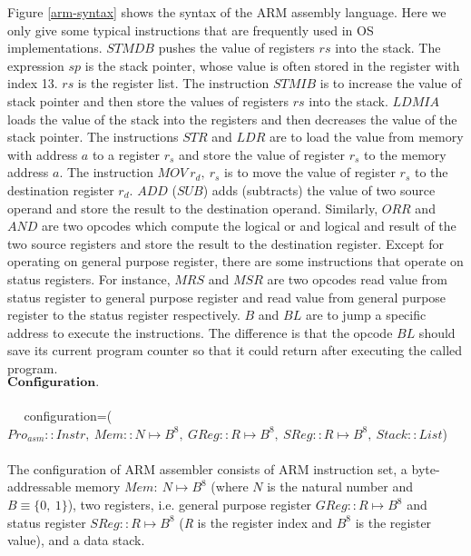 \documentclass[conference]{IEEEtran}
\begin{document}
\par Figure \ref{arm-syntax} shows the syntax of the ARM assembly language. Here we only give some typical instructions that are frequently used in OS implementations. $STMDB$ pushes the value of registers $rs$ into the stack. The expression $sp$ is the stack pointer, whose value is often stored in the register with index 13. $rs$ is the register list. The instruction $STMIB$ is to increase the value of stack pointer and then store the values of registers $rs$ into the stack. $LDMIA$ loads the value of the stack into the registers and then decreases the value of the stack pointer. The instructions $STR$ and $LDR$ are to load the value from memory with address $a$ to a register $r_s$ and store the value of register $r_s$ to the memory address $a$. The instruction $MOV~r_d,~r_s$ is to move the value of register $r_s$ to the destination register $r_d$. $ADD$ ($SUB$) adds (subtracts) the value of two source operand and store the result to the destination operand. Similarly, $ORR$ and $AND$ are two opcodes which compute the logical or and logical and result of the two source registers and store the result to the destination register. Except for operating on general purpose register, there are some instructions that operate on status registers. For instance, $MRS$ and $MSR$ are two opcodes read value from status register to general purpose register and read value from general purpose register to the status register respectively. $B$ and $BL$ are to jump a specific address to execute the instructions. The difference is that the opcode $BL$ should save its current program counter so that it could return after executing the called program.\\

$\textbf{Configuration.}$\\ \\
$~~~~~~$configuration=($Pro_{asm}::Instr,~Mem::N\mapsto B^8,~GReg::\textit{R}\mapsto B^8,~SReg::\textit{R}\mapsto B^8,~Stack::List$)\\ \\

The configuration of ARM assembler consists of ARM instruction set, a byte-addressable memory $Mem:~N\mapsto B^8$ (where $N$ is the natural number and $B\equiv \{0,~1\}$), two registers, i.e. general purpose register $GReg::\textit{R}\mapsto B^8$ and status register $SReg::\textit{R}\mapsto B^8$ (\textit{R} is the register index and $B^8$ is the register value), and a data stack.\\
\end{document}
